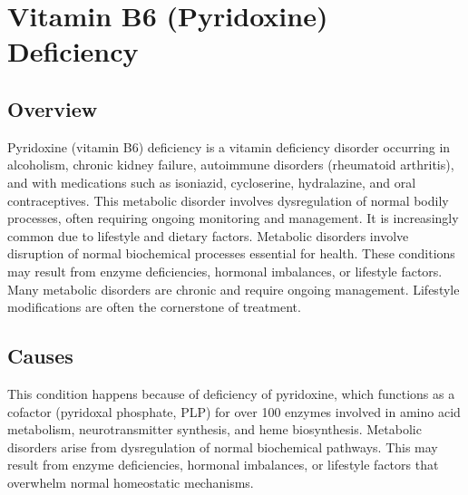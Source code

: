 \chapter{Vitamin B6 (Pyridoxine) Deficiency}
\label{sec:Vitamin B6 Deficiency}

\section{Overview}
Pyridoxine (vitamin B6) deficiency is a vitamin deficiency disorder occurring in alcoholism, chronic kidney failure, autoimmune disorders (rheumatoid arthritis), and with medications such as isoniazid, cycloserine, hydralazine, and oral contraceptives. This metabolic disorder involves dysregulation of normal bodily processes, often requiring ongoing monitoring and management. It is increasingly common due to lifestyle and dietary factors. Metabolic disorders involve disruption of normal biochemical processes essential for health. These conditions may result from enzyme deficiencies, hormonal imbalances, or lifestyle factors. Many metabolic disorders are chronic and require ongoing management. Lifestyle modifications are often the cornerstone of treatment.
\section{Causes}
This condition happens because of deficiency of pyridoxine, which functions as a cofactor (pyridoxal phosphate, PLP) for over 100 enzymes involved in amino acid metabolism, neurotransmitter synthesis, and heme biosynthesis. Metabolic disorders arise from dysregulation of normal biochemical pathways. This may result from enzyme deficiencies, hormonal imbalances, or lifestyle factors that overwhelm normal homeostatic mechanisms.   
